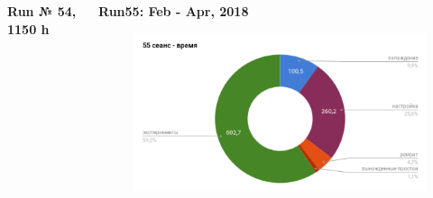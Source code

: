 \documentclass[dvipsnames] {beamer}
\begin{document}
\begin{frame}
\begin{columns}[t]
\begin{block}{\bf \centering Run № 54, 1150 h}
\begin{figure}[H]
       \end{figure}
     \end{block}
      \begin{block}{\bf \centering Run55: Feb - Apr, 2018}
      \begin{figure}[H]
        \includegraphics[width=1.\linewidth]{run55.png} \\
      \end{figure}
    \end{block}    
  \end{columns}  
\end{frame}
\end{document}
